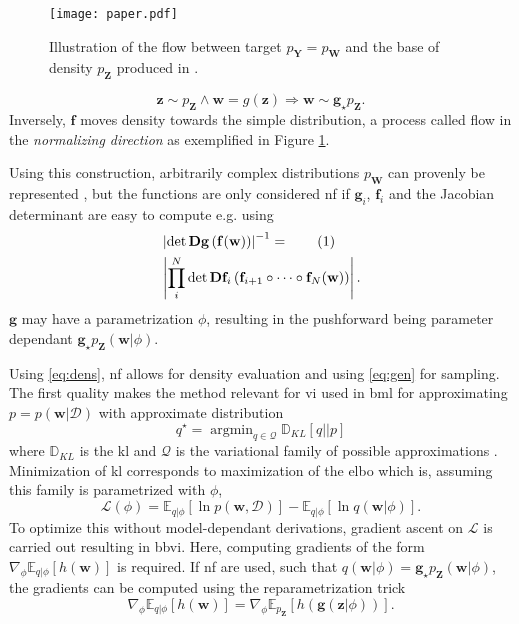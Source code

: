 \documentclass[12pt,fleqn,twocolumn]{article}
\newcommand{\ginv}{\mathbf f}
\newcommand{\push}{\mathbf g_\star p_\mathbf Z}
\newcommand{\numberthis}{\addtocounter{equation}{1}\tag{\theequation}}
\newcommand{\reci}{\ensuremath{^{-1}}}
\begin{document}
\begin{figure}
    \centering
        \texttt{[image: paper.pdf]}
        \caption{Illustration of the flow between target $p_\mathbf Y=p_\mathbf W$ and the base of density $p_\mathbf Z$ produced in \cite[Fig. 1]{koby2021nf}.}
    \label{fig:paper.pdf}
\end{figure}\noindent
\begin{equation}\label{eq:gen}
    \mathbf z \sim p_\mathbf Z \wedge \mathbf w=g(\mathbf z) \Rightarrow \mathbf w \sim \push.
\end{equation}
Inversely, $\ginv$ moves density towards the simple distribution, a process called flow in the \emph{normalizing direction} \cite{koby2021nf} as exemplified in Figure \ref{fig:paper.pdf}.

Using this construction, arbitrarily complex distributions $p_\mathbf W$ can provenly be represented \cite{boga2007triang}, but the functions are only considered \acrshort{nf} if $\mathbf g_i$, $\ginv_i$ and the Jacobian determinant are easy to compute \cite{koby2021nf} e.g. using 
\begin{align*}
    &\left| \det \mathbf D\mathbf g\left(\ginv(\mathbf w)\right) \right| \reci 
    =\numberthis\\
    &\left| \prod_i^N \det\mathbf D \ginv_i\left(\ginv_{i+1}\circ \cdots \circ \ginv_N(\mathbf w) \right)  \right|.
\end{align*}
$\mathbf g$ may have a parametrization $\phi$, resulting in the pushforward being parameter dependant $\push(\mathbf w|\phi)$.

Using \eqref{eq:dens}, \acrshort{nf} allows for density evaluation and using \eqref{eq:gen} for sampling.
The first quality makes the method relevant for \acrfull{vi} used in \acrshort{bml} for approximating $p=p(\mathbf w | \mathcal D)$ with approximate distribution 
\begin{equation}
    q^\star = \operatorname{argmin}_{q\in \mathcal Q} \mathbb D_{KL}[q || p] 
\end{equation}
where $\mathbb D_{KL}$ is the \acrfull{kl} and $\mathcal Q$ is the variational family of possible approximations \cite{Blei2016VariationalIA}.
Minimization of \acrshort{kl} corresponds to maximization of the \acrfull{elbo} which is, assuming this family is parametrized with $\phi$,
\begin{equation}
    \mathcal L(\phi) = \mathbb E_{q|\phi}[\ln p(\mathbf w, \mathcal D)] - \mathbb E_{q|\phi}[\ln q(\mathbf w|\phi)].
\end{equation}
To optimize this without model-dependant derivations, gradient ascent on $\mathcal L$ is carried out resulting in \acrfull{bbvi}.
Here, computing gradients of the form $ \nabla_\phi \mathbb E_{q|\phi}[h(\mathbf w)]$ is required.
If \acrshort{nf} are used, such that $q(\mathbf w|\phi)=\push(\mathbf w| \phi)$, the gradients can be computed using the reparametrization trick \cite{JimenezRezende2015VariationalIW}
\begin{equation}
    \nabla_\phi \mathbb E_{q|\phi}[h(\mathbf w)]
    =
    \nabla_\phi \mathbb E_{p_\mathbf Z}[h(\mathbf g(\mathbf z | \phi))].
\end{equation}
\end{document}
